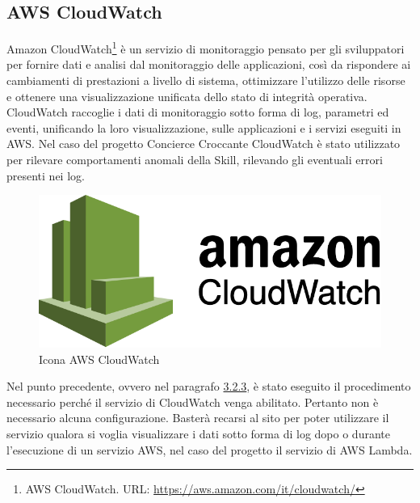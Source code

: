 \subsection{AWS CloudWatch}
Amazon CloudWatch\footnote{AWS CloudWatch. URL: \href{https://aws.amazon.com/it/cloudwatch/}{https://aws.amazon.com/it/cloudwatch/}} è un servizio di monitoraggio pensato per gli sviluppatori per fornire dati e analisi dal monitoraggio delle applicazioni, così da rispondere ai cambiamenti di prestazioni a livello di sistema, ottimizzare l'utilizzo delle risorse e ottenere una visualizzazione unificata dello stato di integrità operativa. CloudWatch raccoglie i dati di monitoraggio sotto forma di log, parametri ed eventi, unificando la loro visualizzazione, sulle applicazioni e i servizi eseguiti in AWS. Nel caso del progetto Concierce Croccante CloudWatch è stato utilizzato per rilevare comportamenti anomali della Skill, rilevando gli eventuali errori presenti nei log.
\begin{figure}[H] 
    \centering 
    \includegraphics[width=0.8\columnwidth]{immagini/amazon-cloudwatch.png}
    \caption{\label{fig:icona_aws_cloudwatch}Icona AWS CloudWatch}
\end{figure}
\noindent Nel punto precedente, ovvero nel paragrafo \hyperref[aws-iam]{3.2.3}, è stato eseguito il procedimento necessario perché il servizio di CloudWatch venga abilitato. Pertanto non è necessario alcuna configurazione. Basterà recarsi al sito per poter utilizzare il servizio qualora si voglia visualizzare i dati sotto forma di log dopo o durante l'esecuzione di un servizio AWS, nel caso del progetto il servizio di AWS Lambda.

